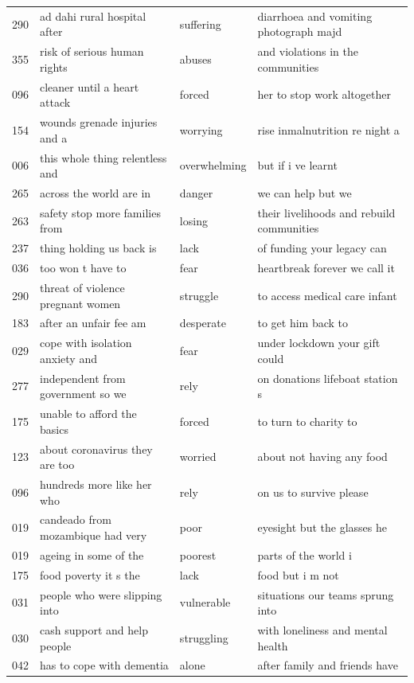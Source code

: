 \begin{table}[ht]
{\begin{tabular}{p{2.5cm}p{5cm}p{2.2cm}p{5cm}}
  290 & ad dahi rural hospital after & suffering & diarrhoea and vomiting photograph majd \\ 
  355 & risk of serious human rights & abuses & and violations in the communities \\ 
  096 & cleaner until a heart attack & forced & her to stop work altogether \\ 
  154 & wounds grenade injuries and a & worrying & rise inmalnutrition re night a \\ 
  006 & this whole thing relentless and & overwhelming & but if i ve learnt \\ 
  265 & across the world are in & danger & we can help but we \\ 
  263 & safety stop more families from & losing & their livelihoods and rebuild communities \\ 
  237 & thing holding us back is & lack & of funding your legacy can \\ 
  036 & too won t have to & fear & heartbreak forever we call it \\ 
  290 & threat of violence pregnant women & struggle & to access medical care infant \\ 
  183 & after an unfair fee am & desperate & to get him back to \\ 
  029 & cope with isolation anxiety and & fear & under lockdown your gift could \\ 
  277 & independent from government so we & rely & on donations lifeboat station s \\ 
  175 & unable to afford the basics & forced & to turn to charity to \\ 
  123 & about coronavirus they are too & worried & about not having any food \\ 
  096 & hundreds more like her who & rely & on us to survive please \\ 
  019 & candeado from mozambique had very & poor & eyesight but the glasses he \\ 
  019 & ageing in some of the & poorest & parts of the world i \\ 
  175 & food poverty it s the & lack & food but i m not \\ 
  031 & people who were slipping into & vulnerable & situations our teams sprung into \\ 
  030 & cash support and help people & struggling & with loneliness and mental health \\ 
  042 & has to cope with dementia & alone & after family and friends have \\ 

\end{tabular}}
\end{table}
